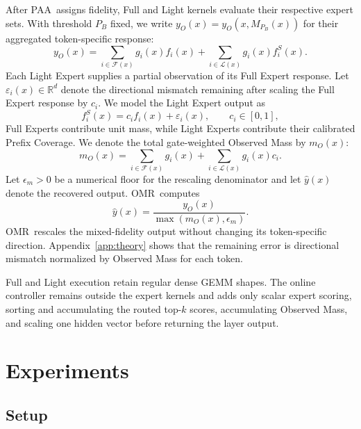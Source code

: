 \documentclass{article}
\newcommand{\PAA}{\textsc{PAA}}
\newcommand{\OMR}{\textsc{OMR}}
\newcommand{\Fset}{\mathcal{F}}
\newcommand{\Lset}{\mathcal{L}}
\begin{document}
After \PAA\ assigns fidelity, Full and Light kernels evaluate their respective expert sets. With threshold $P_B$ fixed, we write $y_O(x)=y_O(x,M_{P_B}(x))$ for their aggregated token-specific response:
\begin{equation}
  y_O(x)=\sum_{i\in\Fset(x)}g_i(x)f_i(x)
  +\sum_{i\in\Lset(x)}g_i(x)f_i^S(x).
  \label{eq:mixed-aggregate}
\end{equation}
Each Light Expert supplies a partial observation of its Full Expert response. Let $\varepsilon_i(x)\in\mathbb{R}^{d}$ denote the directional mismatch remaining after scaling the Full Expert response by $c_i$. We model the Light Expert output as
\begin{equation}
  f_i^S(x)=c_i f_i(x)+\varepsilon_i(x),\qquad c_i\in[0,1],
  \label{eq:light-model}
\end{equation}
Full Experts contribute unit mass, while Light Experts contribute their calibrated Prefix Coverage. We denote the total gate-weighted Observed Mass by $m_O(x)$:
\begin{equation}
  m_O(x)=\sum_{i\in\Fset(x)}g_i(x)
  +\sum_{i\in\Lset(x)}g_i(x)c_i.
  \label{eq:observed-mass}
\end{equation}
Let $\epsilon_m>0$ be a numerical floor for the rescaling denominator and let $\widehat y(x)$ denote the recovered output. \OMR\ computes
\begin{equation}
  \widehat y(x)=\frac{y_O(x)}{\max(m_O(x),\epsilon_m)}.
  \label{eq:omr}
\end{equation}
\OMR\ rescales the mixed-fidelity output without changing its token-specific direction. Appendix~\ref{app:theory} shows that the remaining error is directional mismatch normalized by Observed Mass for each token.

Full and Light execution retain regular dense GEMM shapes. The online controller remains outside the expert kernels and adds only scalar expert scoring, sorting and accumulating the routed top-$k$ scores, accumulating Observed Mass, and scaling one hidden vector before returning the layer output.

\section{Experiments}
\label{sec:experiments}

\subsection{Setup}
\end{document}
